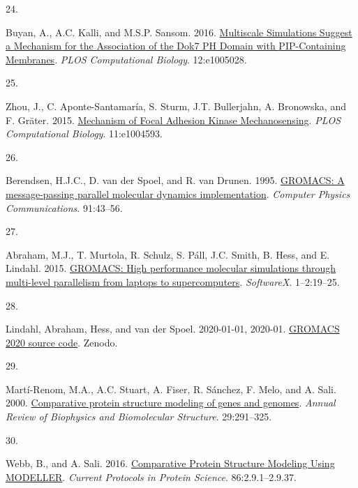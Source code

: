 \documentclass[
  twocolumn]{biophys-new-mod}
\newlength{\cslhangindent}
\newlength{\csllabelwidth}
\newlength{\cslentryspacingunit} %
\newenvironment{CSLReferences}[2] %
 {%
  \setlength{\parindent}{0pt}
  \ifodd #1
  \let\oldpar\par
  \def\par{\hangindent=\cslhangindent\oldpar}
  \fi
  \setlength{\parskip}{#2\cslentryspacingunit}
 }%
 {}
\newcommand{\CSLLeftMargin}[1]{\parbox[t]{\csllabelwidth}{#1}}
\newcommand{\CSLRightInline}[1]{\parbox[t]{\linewidth - \csllabelwidth}{#1}\break}
\begin{document}
\begin{CSLReferences}{0}{0}
\leavevmode{}%
\CSLLeftMargin{24. }%
\CSLRightInline{Buyan, A., A.C. Kalli, and M.S.P. Sansom. 2016.
\href{https://doi.org/10.1371/journal.pcbi.1005028}{Multiscale
{Simulations Suggest} a {Mechanism} for the {Association} of the {Dok7
PH Domain} with {PIP-Containing Membranes}}. \emph{PLOS Computational
Biology}. 12:e1005028.}

\leavevmode{}%
\CSLLeftMargin{25. }%
\CSLRightInline{Zhou, J., C. Aponte-Santamaría, S. Sturm, J.T.
Bullerjahn, A. Bronowska, and F. Gräter. 2015.
\href{https://doi.org/10.1371/journal.pcbi.1004593}{Mechanism of {Focal
Adhesion Kinase Mechanosensing}}. \emph{PLOS Computational Biology}.
11:e1004593.}

\leavevmode{}%
\CSLLeftMargin{26. }%
\CSLRightInline{Berendsen, H.J.C., D. van der Spoel, and R. van Drunen.
1995. \href{https://doi.org/10.1016/0010-4655(95)00042-E}{{GROMACS}: {A}
message-passing parallel molecular dynamics implementation}.
\emph{Computer Physics Communications}. 91:43--56.}

\leavevmode{}%
\CSLLeftMargin{27. }%
\CSLRightInline{Abraham, M.J., T. Murtola, R. Schulz, S. Páll, J.C.
Smith, B. Hess, and E. Lindahl. 2015.
\href{https://doi.org/10.1016/j.softx.2015.06.001}{{GROMACS}: {High}
performance molecular simulations through multi-level parallelism from
laptops to supercomputers}. \emph{SoftwareX}. 1--2:19--25.}

\leavevmode{}%
\CSLLeftMargin{28. }%
\CSLRightInline{Lindahl, Abraham, Hess, and van der Spoel. 2020-01-01,
2020-01. \href{https://doi.org/10.5281/zenodo.3562495}{{GROMACS} 2020
source code}. {Zenodo}.}

\leavevmode{}%
\CSLLeftMargin{29. }%
\CSLRightInline{Martí-Renom, M.A., A.C. Stuart, A. Fiser, R. Sánchez, F.
Melo, and A. Sali. 2000.
\href{https://doi.org/10.1146/annurev.biophys.29.1.291}{Comparative
protein structure modeling of genes and genomes}. \emph{Annual Review of
Biophysics and Biomolecular Structure}. 29:291--325.}

\leavevmode{}%
\CSLLeftMargin{30. }%
\CSLRightInline{Webb, B., and A. Sali. 2016.
\href{https://doi.org/10.1002/cpps.20}{Comparative {Protein Structure
Modeling Using MODELLER}}. \emph{Current Protocols in Protein Science}.
86:2.9.1--2.9.37.}


\end{CSLReferences}
\end{document}
